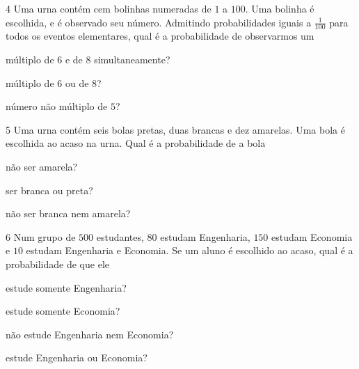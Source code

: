 \num{4}  Uma urna contém cem bolinhas numeradas de $1$ a $100$. Uma bolinha é
escolhida, e é observado seu número. Admitindo probabilidades iguais a
$\frac{1}{100}$ para todos os eventos elementares, qual é a probabilidade de
observarmos um

\begin{escolha}
\item múltiplo de $6$ e de $8$ simultaneamente?\\

\item múltiplo de $6$ ou de $8$?\\

\item número não múltiplo de $5$?\\
\end{escolha}

\num{5}  Uma urna contém seis bolas pretas, duas brancas e dez amarelas.
Uma bola é escolhida ao acaso na urna. Qual é a probabilidade de a bola

\begin{escolha}
\item não ser amarela?\\

\item ser branca ou preta?\\

\item não ser branca nem amarela?\\
\end{escolha}

\num{6} Num grupo de $500$ estudantes, $80$ estudam Engenharia, $150$ estudam
Economia e $10$ estudam Engenharia e Economia. Se um aluno é escolhido ao
acaso, qual é a probabilidade de que ele

\begin{escolha}
\item estude somente Engenharia?\\

\item estude somente Economia?\\

\item não estude Engenharia nem Economia?\\

\item estude Engenharia ou Economia?\\

\end{escolha}

